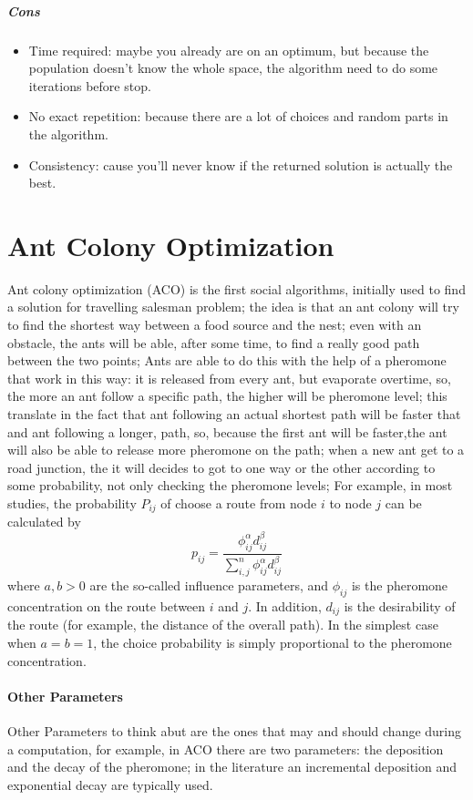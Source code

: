 \documentclass[12pt,a4paper]{report}
\begin{document}
\subparagraph{Cons}
\begin{itemize}
\item Time required: maybe you already are on an optimum, but because the population doesn't know the whole space, the algorithm need to do some iterations before stop.
\item No exact repetition: because there are a lot of choices and random parts in the algorithm.
\item Consistency: cause you'll never know if the returned solution is actually the best.
\end{itemize}

\section{Ant Colony Optimization}
Ant colony optimization (ACO) is the first social algorithms, initially used to find a solution for travelling salesman problem; the idea is that an ant colony will try to find the shortest way between a food source and the nest; even with an obstacle, the ants will be able, after some time, to find a really good path between the two points; Ants are able to do this with the help of a pheromone that work in this way: it is released from every ant, but evaporate overtime, so, the more an ant follow a specific path, the higher will be pheromone level; this translate in the fact that ant following an actual shortest path will be faster that and ant following a longer, path, so, because the first ant will be faster,the ant will also be able to release more pheromone on the path; when a new ant get to a road junction, the it will decides to got to one way or the other according to some probability, not only checking the pheromone levels; For example, in most studies, the probability $P_{ij}$ of choose a route from node $i$ to node $j$ can be calculated by
$$
	p_{ij} = \dfrac{ \phi_{ij}^{\alpha} d_{ij}^{\beta} }{\displaystyle\sum_{i, j}^{n} \phi_{ij}^{\alpha} d_{ij}^{\beta} }
$$
where $a, b > 0$ are the so-called influence parameters, and $\phi_{ij}$ is the pheromone concentration on the route between $i$ and $j$. In addition, $d_{ij}$ is the desirability of the route (for example, the distance of the overall path). In the simplest case when $a = b = 1$, the choice probability is simply proportional to the pheromone concentration.

\paragraph{Other Parameters}
Other Parameters to think abut are the ones that may and should change during a computation, for example, in ACO there are two parameters: the deposition and the decay of the pheromone; in the literature an incremental deposition and exponential decay are typically used.
\end{document}
